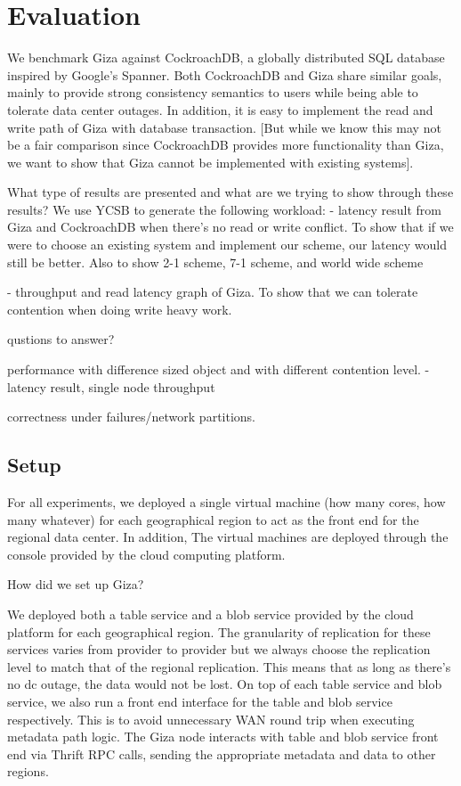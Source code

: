 \section{Evaluation}
We benchmark Giza against CockroachDB, a globally distributed SQL database inspired by Google’s Spanner. Both CockroachDB and Giza share similar goals, mainly to provide strong consistency semantics to users while being able to tolerate data center outages. In addition, it is easy to implement the read and write path of Giza with database transaction. [But while we know this may not be a fair comparison since CockroachDB provides more functionality than Giza, we want to show that Giza cannot be implemented with existing systems].

What type of results are presented and what are we trying to show through these results? We use YCSB to generate the following workload:
- latency result from Giza and CockroachDB when there’s no read or write conflict. To show that if we were to choose an existing system and implement our scheme, our latency would still be better. 
Also to show 2-1 scheme, 7-1 scheme, and world wide scheme

- throughput and read latency graph of Giza. To show that we can tolerate contention when doing write heavy work.

qustions to answer?

performance with difference sized object and with different contention level.
 -latency result, single node throughput

correctness under failures/network partitions.
 

\subsection{Setup}
For all experiments, we deployed a single virtual machine (how many cores, how many whatever) for each geographical region to act as the front end for the regional data center. In addition, The virtual machines are deployed through the console provided by the cloud computing platform. 

How did we set up Giza?

We deployed both a table service and a blob service provided by the cloud platform for each geographical region. The granularity of replication for these services varies from provider to provider but we always choose the replication level to match that of the regional replication. This means that as long as there’s no dc outage, the data would not be lost. On top of each table service and blob service, we also run a front end interface for the table and blob service respectively. This is to avoid unnecessary WAN round trip when executing metadata path logic. The Giza node interacts with table and blob service front end via Thrift RPC calls, sending the appropriate metadata and data to other regions.  

